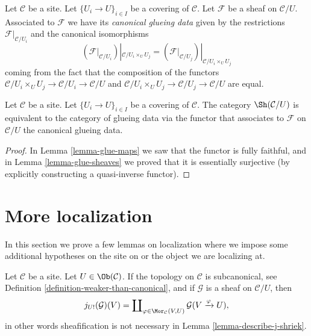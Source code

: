 \noindent
Let $\mathcal{C}$ be a site.
Let $\{U_i \to U\}_{i \in I}$ be a covering of $\mathcal{C}$.
Let $\mathcal{F}$ be a sheaf on $\mathcal{C}/U$.
Associated to $\mathcal{F}$ we have its
{\it canonical glueing data} given by the restrictions
$\mathcal{F}|_{\mathcal{C}/U_i}$ and the canonical isomorphisms
$$
\left(\mathcal{F}|_{\mathcal{C}/U_i}\right)|_{\mathcal{C}/U_i \times_U U_j}
=
\left(\mathcal{F}|_{\mathcal{C}/U_j}\right)|_{\mathcal{C}/U_i \times_U U_j}
$$
coming from the fact that the composition of the functors
$\mathcal{C}/U_i \times_U U_j \to \mathcal{C}/U_i \to \mathcal{C}/U$
and
$\mathcal{C}/U_i \times_U U_j \to \mathcal{C}/U_j \to \mathcal{C}/U$
are equal.

\begin{lemma}
\label{lemma-mapping-property-glue}
Let $\mathcal{C}$ be a site.
Let $\{U_i \to U\}_{i \in I}$ be a covering of $\mathcal{C}$.
The category $\Sh(\mathcal{C}/U)$ is equivalent
to the category of glueing data via the functor that associates
to $\mathcal{F}$ on $\mathcal{C}/U$ the canonical glueing data.
\end{lemma}

\begin{proof}
In
Lemma \ref{lemma-glue-maps}
we saw that the functor is fully faithful, and in
Lemma \ref{lemma-glue-sheaves}
we proved that it is essentially surjective (by explicitly constructing
a quasi-inverse functor).
\end{proof}




\section{More localization}
\label{section-more-localize}

\noindent
In this section we prove a few lemmas on localization where we
impose some additional hypotheses on the site on or the object
we are localizing at.

\begin{lemma}
\label{lemma-describe-j-shriek-good-site}
Let $\mathcal{C}$ be a site.
Let $U \in \Ob(\mathcal{C})$.
If the topology on $\mathcal{C}$ is subcanonical, see
Definition \ref{definition-weaker-than-canonical},
and if $\mathcal{G}$ is a sheaf on $\mathcal{C}/U$, then
$$
j_{U!}(\mathcal{G})(V)
=
\coprod\nolimits_{\varphi \in \Mor_\mathcal{C}(V, U)}
\mathcal{G}(V \xrightarrow{\varphi} U),
$$
in other words sheafification is not necessary in
Lemma \ref{lemma-describe-j-shriek}.
\end{lemma}

